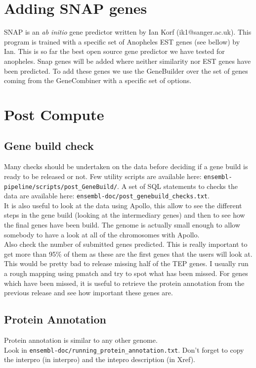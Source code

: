 \documentclass[a4paper,10pt]{article}
\begin{document}
\section{Adding SNAP genes}
SNAP is an \textit{ab initio} gene predictor written by Ian Korf (ik1@sanger.ac.uk). This program is trained with a specific set of Anopheles EST genes (see bellow) by Ian. This is so far the best open source gene predictor we have tested for anopheles. Snap genes will be added where neither similarity nor EST genes have been predicted. To add these genes we use the GeneBuilder over the set of genes coming from the GeneCombiner with a specific set of options. 


\section{Post Compute}
\subsection{Gene build check}
Many checks should be undertaken on the data before deciding if a gene build is ready to be released or not. Few utility scripts are available here: \texttt{ensembl-pipeline/scripts/post\_GeneBuild/}. A set of SQL statements to checks the data are available here: \texttt{ensembl-doc/post\_genebuild\_checks.txt}.\\
It is also useful to look at the data using Apollo, this allow to see the different steps in the gene build (looking at the intermediary genes) and then to see how the final genes have been build. The genome is actually small enough to allow somebody to have a look at all of the chromosomes with Apollo.\\
Also check the number of submitted genes predicted. This is really important to get more than 95\% of them as these are the first genes that the users will look at. This would be pretty bad to release missing half of the TEP genes. I usually run a rough mapping using pmatch and try to spot what has been missed. For genes which have been missed, it is useful to retrieve the protein annotation from the previous release and see how important these genes are.

\subsection{Protein Annotation}
Protein annotation is similar to any other genome. \\Look in \texttt{ensembl-doc/running\_protein\_annotation.txt}. Don't forget to copy the interpro (in interpro) and the intepro description (in Xref).
\end{document}
